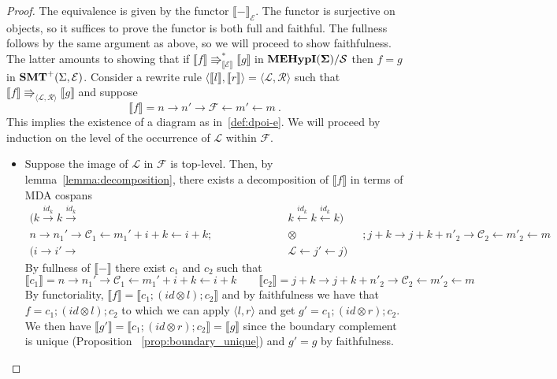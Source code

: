 \begin{proof}
The equivalence is given by the functor $\llbracket - \rrbracket_{\mathcal{E}}$.
The functor is surjective on objects,  so it suffices to prove the functor is both full and faithful.
The fullness follows by the same argument as above, so we will proceed to show faithfulness.
The latter amounts to showing that if $\llbracket f \rrbracket \Rrightarrow_{\llbracket \mathcal{E} \rrbracket}^{*} \llbracket g \rrbracket$ in ${\mathbf{MEHypI(\Sigma)}} / \mathcal{S}$ then $f = g$ in $\mathbf{SMT}^{+}(\Sigma,\mathcal{E})$.
Consider a rewrite rule $\langle \llbracket l \rrbracket, \llbracket r \rrbracket \rangle = \langle \mathcal{L}, \mathcal{R} \rangle$ such that $\llbracket f \rrbracket \Rrightarrow_{\langle \mathcal{L}, \mathcal{R} \rangle} \llbracket g \rrbracket$ and suppose
\[
	\llbracket f \rrbracket = n \xrightarrow{} n' \xrightarrow{} \mathcal{F} \xleftarrow{} m' \xleftarrow{} m ~.
\]
This implies the existence of a diagram as in~\ref{def:dpoi-e}.
We will proceed by induction on the level of the occurrence of $\mathcal{L}$ within $\mathcal{F}$.
\begin{itemize}
	\item Suppose the image of $\mathcal{L}$ in $\mathcal{F}$ is top-level.
		  Then, by lemma~\ref{lemma:decomposition}, there exists a decomposition of $\llbracket f \rrbracket$ in terms of MDA cospans
		\begin{align*}
			(k \xrightarrow{id_{k}} k \xrightarrow{id_{k}} &k \xleftarrow{id_{k}} k \xleftarrow{id_{k}} k)\\
			n \xrightarrow{} n_{1}' \xrightarrow{} \mathcal{C}_{1} \xleftarrow{} m_{1}' + i + k \xleftarrow{} i + k; \qquad\qquad\qquad &\otimes \qquad\qquad\qquad ; j + k \xrightarrow{} j + k + n'_{2} \xrightarrow{} \mathcal{C}_{2} \xleftarrow{} m'_{2} \xleftarrow{} m\\
			(i \xrightarrow{} i' \xrightarrow{} &\mathcal{L} \xleftarrow{} j' \xleftarrow{} j)
		\end{align*}
		By fullness of $\llbracket - \rrbracket$ there exist $c_{1}$ and $c_{2}$ such that 
		\[
		\llbracket c_{1} \rrbracket = n \xrightarrow{} n_{1}' \xrightarrow{} \mathcal{C}_{1} \xleftarrow{} m_{1}' + i + k \xleftarrow{} i + k \qquad \llbracket c_{2} \rrbracket = j + k \xrightarrow{} j + k + n'_{2} \xrightarrow{} \mathcal{C}_{2} \xleftarrow{} m'_{2} \xleftarrow{} m
		\]
		By functoriality, $\llbracket f \rrbracket = \llbracket c_{1};(id \otimes l);c_{2} \rrbracket$ and by faithfulness we have that $f = c_{1};(id \otimes l);c_{2}$ to which we can apply $\langle l, r \rangle$ and get $g' = c_{1};(id \otimes r);c_{2}$.
		We then have $\llbracket g' \rrbracket = \llbracket c_{1};(id \otimes r);c_{2} \rrbracket =  \llbracket g \rrbracket$ since the boundary complement is unique (Proposition ~\ref{prop:boundary_unique}) and $g' = g$ by faithfulness.


\end{itemize}
\end{proof}

